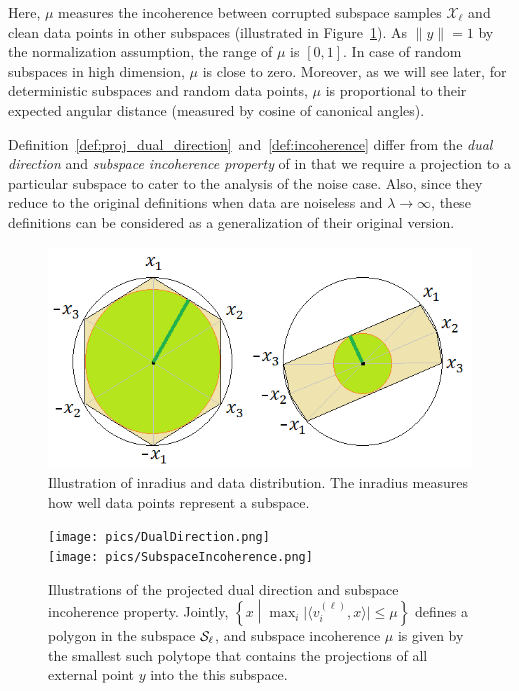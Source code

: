 \documentclass{ctexart}
\begin{document}
Here, $\mu$ measures the incoherence between corrupted subspace samples $\mathcal{X}_{\ell}$ and clean data points in other subspaces (illustrated in Figure~\ref{fig:SubspaceIncoherence}). As $\|y\|=1$ by the normalization assumption, the range of $\mu$ is $[0,1]$. In case of random subspaces in high dimension, $\mu$ is close to zero. Moreover, as we will see later, for deterministic subspaces and random data points, $\mu$ is proportional to their expected angular distance (measured by cosine of canonical angles).

Definition~\ref{def:proj_dual_direction}~and~\ref{def:incoherence} differ from the \emph{dual direction} and \emph{subspace incoherence property} of \cite{soltanolkotabi2011geometric} in that we require a projection to a particular subspace to cater to the analysis of the noise case. Also, since they reduce to the original definitions when data are noiseless and $\lambda\rightarrow \infty$, these definitions can be considered as a generalization of their original version.

%
\begin{figure}
  \centering
  \includegraphics[width=0.7\linewidth]{pics/inradius.png}\\
  \caption{Illustration of inradius and data distribution. The inradius measures how well data points represent a subspace. }\label{fig:inradius}
  \texttt{[image: pics/DualDirection.png]}\\
  \texttt{[image: pics/SubspaceIncoherence.png]}
  \caption{Illustrations of the projected dual direction and subspace incoherence property. Jointly, $\left\{x \middle| \max_{i}\big|\langle v_i^{(\ell)},x\rangle\big|\leq \mu\right\}$ defines a polygon in the subspace $\mathcal{S}_\ell$, and subspace incoherence $\mu$ is given by the smallest such polytope that contains the projections of all external point $y$ into the this subspace.}\label{fig:SubspaceIncoherence}
\end{figure}
\end{document}
